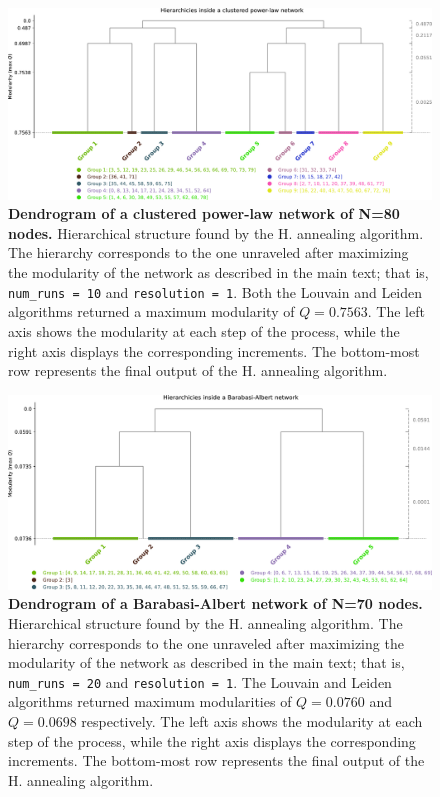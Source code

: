 \documentclass[pdflatex,sn-mathphys-num]{sn-jnl}%
\begin{document}
\begin{figure}[h]
    \centering
    \includegraphics[width=1\linewidth]{Figures/FigS3.pdf}
    \caption{\textbf{Dendrogram of a clustered power-law network \cite{Holme2002} of N=80 nodes.} Hierarchical structure found by the H. annealing algorithm. The hierarchy corresponds to the one unraveled after maximizing the modularity of the network as described in the main text; that is, {\tt num\_runs = 10} and {\tt resolution = 1}. Both the Louvain and Leiden algorithms returned a maximum modularity of $Q=0.7563$. The left axis shows the modularity at each step of the process, while the right axis displays the corresponding increments. The bottom-most row represents the final output of the H. annealing algorithm.}
    \label{fig:dendro_pw_supp}
\end{figure}

\begin{figure}[h]
    \centering
    \includegraphics[width=1\linewidth]{Figures/FigS4.pdf}
    \caption{\textbf{Dendrogram of a Barabasi-Albert network \cite{Barabasi1999} of N=70 nodes.} Hierarchical structure found by the H. annealing algorithm. The hierarchy corresponds to the one unraveled after maximizing the modularity of the network as described in the main text; that is, {\tt num\_runs = 20} and {\tt resolution = 1}. The Louvain and Leiden algorithms returned maximum modularities of $Q=0.0760$ and $Q=0.0698$ respectively. The left axis shows the modularity at each step of the process, while the right axis displays the corresponding increments. The bottom-most row represents the final output of the H. annealing algorithm.}
    \label{fig:dendro_ba}
\end{figure}
\end{document}
